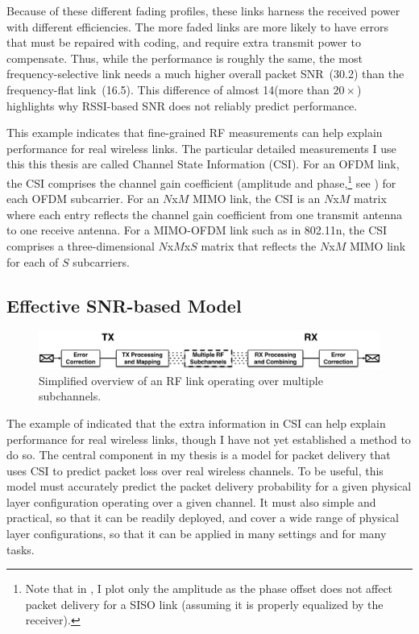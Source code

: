 Because of these different fading profiles, these links harness the received power with different efficiencies.
The more faded links are more likely to have errors that must be repaired with coding, and require extra transmit power to compensate. Thus, while the performance is roughly the same, the most frequency-selective link needs a much higher overall packet SNR~(30.2\dB) than the frequency-flat link~(16.5\dB). This difference of almost 14\dB (more than $20\times$) highlights why RSSI-based SNR does not reliably predict performance.

This example indicates that fine-grained RF measurements can help explain performance for real wireless links. The particular detailed measurements I use this this thesis are called Channel State Information (CSI). For an OFDM link, the CSI comprises the channel gain coefficient (amplitude and phase,\footnote{Note that in , I plot only the amplitude as the phase offset does not affect packet delivery for a SISO link (assuming it is properly equalized by the receiver).} see ) for each OFDM subcarrier. For an $N$x$M$ MIMO link, the CSI is an $N$x$M$ matrix where each entry reflects the channel gain coefficient from one transmit antenna to one receive antenna. For a MIMO-OFDM link such as in 802.11n, the CSI comprises a three-dimensional $N$x$M$x$S$ matrix that reflects the $N$x$M$ MIMO link for each of $S$ subcarriers.

\subsection{Effective SNR-based Model}
\begin{figure}[t!]
	\centering
	\includegraphics[width=\textwidth]{figures/esnr_intuitive.pdf}
	\caption[Simplified overview of an RF link operating over multiple subchannels]{\label{fig:esnr_intuitive}Simplified overview of an RF link operating over multiple subchannels.}
\end{figure}

The example of  indicated that the extra information in CSI can help explain performance for real wireless links, though I have not yet established a method to do so. The central component in my thesis is a model for packet delivery that uses CSI to predict packet loss over real wireless channels. To be useful, this model must accurately predict the packet delivery probability for a given physical layer configuration operating over a given channel. It must also simple and practical, so that it can be readily deployed, and cover a wide range of physical layer configurations, so that it can be applied in many settings and for many tasks.

